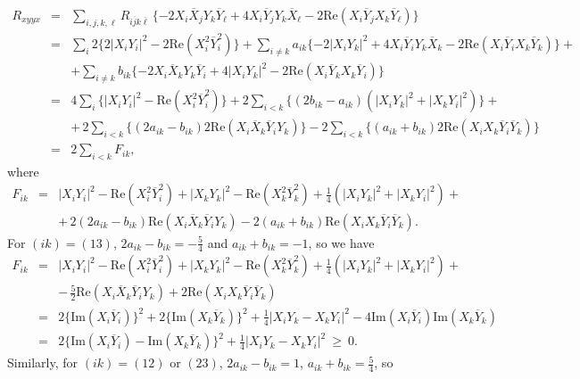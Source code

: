 \documentclass{amsart}
\numberwithin{equation}{section}
\theoremstyle{definition}
\renewcommand{\1}{\mathds{1}}
\renewcommand{\>}{\rightarrow}
\begin{document}
\begin{eqnarray*}
 R_{xyyx} & = &  \sum_{i,j,k,\ell} R_{i\overline{j}k\overline{\ell}} \,\{ -2X_i\overline{X}_j Y_k \overline{Y}_{\ell} + 4 X_i\overline{Y}_j Y_k \overline{X}_{\ell} -  2\mbox{Re} (X_i\overline{Y}_j X_k \overline{Y}_{\ell}) \}  \\
 & = & \sum_i 2 \{ 2|X_iY_i|^2 - 2\mbox{Re} (X_i^2\overline{Y}_i^2)\} + \sum_{i\neq k} a_{ik} \{-2|X_iY_k|^2 + 4 X_i\overline{Y}_iY_k\overline{X}_k  - 2\mbox{Re} (X_i\overline{Y}_iX_k\overline{Y}_k ) \} + \\
 & & + \sum_{i\neq k} b_{ik} \{ -2  X_i\overline{X}_kY_k\overline{Y}_i + 4 |X_iY_k|^2 - 2\mbox{Re} (X_i\overline{Y}_kX_k\overline{Y}_i ) \} \\
 & = & 4\sum_i \{ |X_iY_i|^2 - \mbox{Re} (X_i^2\overline{Y}_i^2)\} +  2\sum_{i<k} \{ (2b_{ik}-a_{ik})(|X_iY_k|^2 + |X_kY_i|^2) \} + \\
&&  + \, 2\sum_{i<k} \{ (2a_{ik}-b_{ik}) 2\mbox{Re} (X_i\overline{X}_k \overline{Y}_i Y_k ) \} -2\sum_{i<k} \{ (a_{ik}+b_{ik}) 2\mbox{Re} (X_iX_k\overline{Y}_i \overline{Y}_k )  \} \\
& = & 2\sum_{i<k} F_{ik},
\end{eqnarray*}
where
\begin{eqnarray*}
F_{ik} & = & |X_iY_i|^2 - \mbox{Re} (X_i^2\overline{Y}_i^2) + |X_kY_k|^2 - \mbox{Re} (X_k^2\overline{Y}_k^2)
+ \frac{1}{4}(|X_iY_k|^2 + |X_kY_i|^2) + \\
&& + \, 2(2a_{ik}-b_{ik}) \mbox{Re} (X_i\overline{X}_k \overline{Y}_i Y_k ) -  2(a_{ik}+b_{ik}) \mbox{Re} (X_iX_k\overline{Y}_i \overline{Y}_k ).
\end{eqnarray*}
For $(ik)=(13)$, $2a_{ik}-b_{ik}=-\frac{5}{4}$ and $a_{ik}+b_{ik}=-1$, so we have
\begin{eqnarray*}
F_{ik} & = & |X_iY_i|^2 - \mbox{Re} (X_i^2\overline{Y}_i^2) + |X_kY_k|^2 - \mbox{Re} (X_k^2\overline{Y}_k^2)
+ \frac{1}{4}(|X_iY_k|^2 + |X_kY_i|^2) + \\
&& - \, \frac{5}{2} \mbox{Re} (X_i\overline{X}_k \overline{Y}_i Y_k ) + 2\mbox{Re} (X_iX_k\overline{Y}_i \overline{Y}_k )\\
& = & 2\{\mbox{Im}(X_i\overline{Y}_i)\}^2 + 2\{\mbox{Im}(X_k\overline{Y}_k)\}^2 + \frac{1}{4} |X_iY_k - X_kY_i |^2 -4 \mbox{Im}(X_i\overline{Y}_i)\mbox{Im}(X_k\overline{Y}_k) \\
& = & 2 \{ \mbox{Im}(X_i\overline{Y}_i) - \mbox{Im}(X_k\overline{Y}_k) \}^2 + \frac{1}{4} |X_iY_k - X_kY_i |^2 \ \geq \ 0.
\end{eqnarray*}
Similarly, for $(ik)=(12)$ or $(23)$, $2a_{ik}-b_{ik}=1$, $a_{ik}+b_{ik}=\frac{5}{4}$, so
\end{document}
